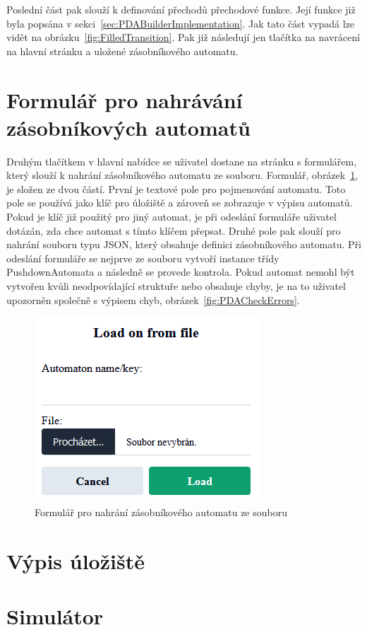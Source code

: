 Poslední část pak slouží k definování přechodů přechodové funkce. Její funkce již byla popsána v sekci~\ref{sec:PDABuilderImplementation}. Jak tato část vypadá lze vidět na obrázku~\ref{fig:FilledTransition}. Pak již následují jen tlačítka na navrácení na hlavní stránku a uložené zásobníkového automatu.

\section{Formulář pro nahrávání zásobníkových automatů}\label{sec:UploadForm}

Druhým tlačítkem v hlavní nabídce se uživatel dostane na stránku s formulářem, který slouží k nahrání zásobníkového automatu ze souboru. Formulář, obrázek~\ref{fig:UploadForm}, je složen ze dvou částí. První je textové pole pro pojmenování automatu. Toto pole se používá jako klíč pro úložiště a zároveň se zobrazuje v výpisu automatů. Pokud je klíč již použitý pro jiný automat, je při odeslání formuláře uživatel dotázán, zda chce automat s tímto klíčem přepsat. Druhé pole pak slouží pro nahrání souboru typu JSON, který obsahuje definici zásobníkového automatu. Při odeslání formuláře se nejprve ze souboru vytvoří instance třídy PushdownAutomata a následně se provede kontrola. Pokud automat nemohl být vytvořen kvůli neodpovídající struktuře nebo obsahuje chyby, je na to uživatel upozorněn společně s výpisem chyb, obrázek~\ref{fig:PDACheckErrors}.

\begin{figure}[h]
    \centering
    \includegraphics{Figures/PrntScrn_UI_Upload.png}
    \caption{Formulář pro nahrání zásobníkového automatu ze souboru}\label{fig:UploadForm}
\end{figure}

\section{Výpis úložiště}\label{sec:StoragePage}
\section{Simulátor}\label{sec:SimulatorPage}



\endinput